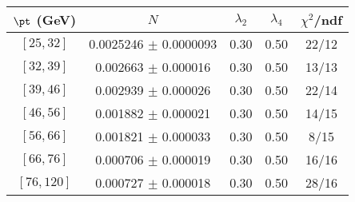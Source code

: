 \begin{tabular}{c||c|c|c|c}
$\pt$ (GeV) & $N$ & $\lambda_{2}$ & $\lambda_4$  & $\chi^2$/ndf  \\
\hline
$[25, 32]$ & 0.0025246 $\pm$ 0.0000093 & 0.30 & 0.50 & 22/12\\
$[32, 39]$ & 0.002663 $\pm$ 0.000016 & 0.30 & 0.50 & 13/13\\
$[39, 46]$ & 0.002939 $\pm$ 0.000026 & 0.30 & 0.50 & 22/14\\
$[46, 56]$ & 0.001882 $\pm$ 0.000021 & 0.30 & 0.50 & 14/15\\
$[56, 66]$ & 0.001821 $\pm$ 0.000033 & 0.30 & 0.50 & 8/15\\
$[66, 76]$ & 0.000706 $\pm$ 0.000019 & 0.30 & 0.50 & 16/16\\
$[76, 120]$ & 0.000727 $\pm$ 0.000018 & 0.30 & 0.50 & 28/16\\
\end{tabular}
